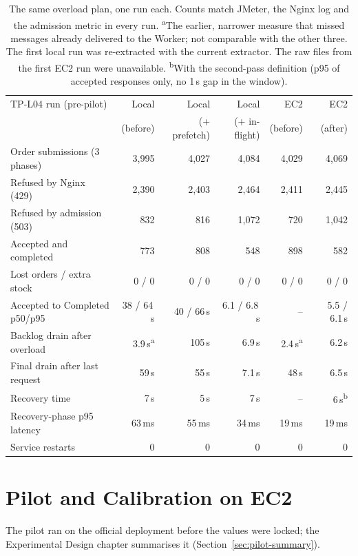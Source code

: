 \documentclass[a4paper]{report}
\begin{document}
\begin{table}[tbp]
\centering
\scriptsize
\setlength{\tabcolsep}{2.5pt}
\begin{tabular}{lrrrrr}
\toprule
TP-L04 run (pre-pilot) & Local & Local & Local & EC2 & EC2 \\
 & (before) & (+ prefetch) & (+ in-flight) & (before) & (after) \\
\midrule
Order submissions (3 phases) & 3,995 & 4,027 & 4,084 & 4,029 & 4,069 \\
Refused by Nginx (429) & 2,390 & 2,403 & 2,464 & 2,411 & 2,445 \\
Refused by admission (503) & 832 & 816 & 1,072 & 720 & 1,042 \\
Accepted and completed & 773 & 808 & 548 & 898 & 582 \\
Lost orders / extra stock & 0 / 0 & 0 / 0 & 0 / 0 & 0 / 0 & 0 / 0 \\
Accepted to Completed p50/p95 & 38 / 64\,s & 40 / 66\,s & 6.1 / 6.8\,s & -- & 5.5 / 6.1\,s \\
Backlog drain after overload & 3.9\,s\textsuperscript{a} & 105\,s & 6.9\,s & 2.4\,s\textsuperscript{a} & 6.2\,s \\
Final drain after last request & 59\,s & 55\,s & 7.1\,s & 48\,s & 6.5\,s \\
Recovery time & 7\,s & 5\,s & 7\,s & -- & 6\,s\textsuperscript{b} \\
Recovery-phase p95 latency & 63\,ms & 55\,ms & 34\,ms & 19\,ms & 19\,ms \\
Service restarts & 0 & 0 & 0 & 0 & 0 \\
\bottomrule
\end{tabular}
\caption{The same overload plan, one run each. Counts match JMeter, the Nginx
log and the admission metric in every run. \textsuperscript{a}The earlier,
narrower measure that missed messages already delivered to the Worker; not
comparable with the other three. The first local run was re-extracted with
the current extractor. The raw files from the first EC2 run were unavailable.
\textsuperscript{b}With the second-pass definition (p95 of accepted responses
only, no 1\,s gap in the window).}
\label{tab:overload-local-ec2}
\end{table}


\chapter{Pilot and Calibration on EC2}
\label{app:pilot}

The pilot ran on the official deployment before the values were locked; the
Experimental Design chapter summarises it (Section~\ref{sec:pilot-summary}).
\end{document}
